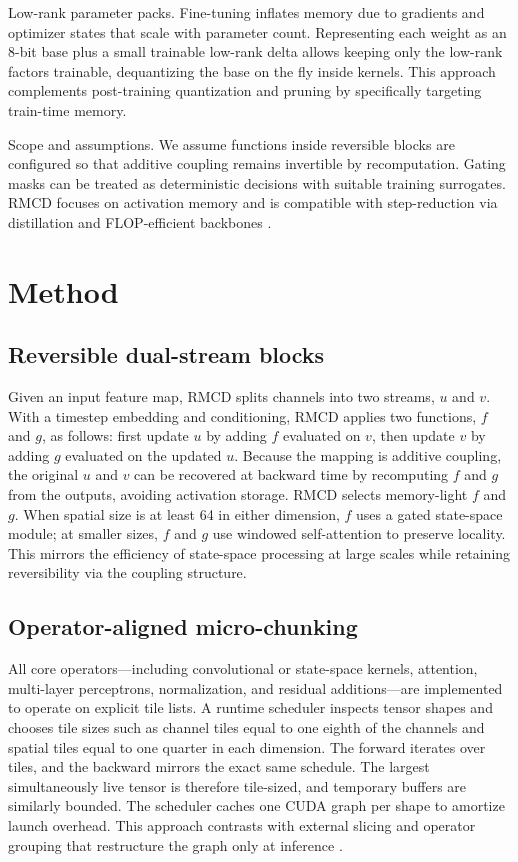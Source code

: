 \documentclass{article}
\begin{document}
Low-rank parameter packs. Fine-tuning inflates memory due to gradients and optimizer states that scale with parameter count. Representing each weight as an 8-bit base plus a small trainable low-rank delta allows keeping only the low-rank factors trainable, dequantizing the base on the fly inside kernels. This approach complements post-training quantization \cite{shang-2022-post} and pruning \cite{fang-2023-structural} by specifically targeting train-time memory.

Scope and assumptions. We assume functions inside reversible blocks are configured so that additive coupling remains invertible by recomputation. Gating masks can be treated as deterministic decisions with suitable training surrogates. RMCD focuses on activation memory and is compatible with step-reduction via distillation \cite{salimans-2024-multistep} and FLOP-efficient backbones \cite{yan-2023-diffusion}.

\section{Method}
\subsection{Reversible dual-stream blocks}
Given an input feature map, RMCD splits channels into two streams, \(u\) and \(v\). With a timestep embedding and conditioning, RMCD applies two functions, \(f\) and \(g\), as follows: first update \(u\) by adding \(f\) evaluated on \(v\), then update \(v\) by adding \(g\) evaluated on the updated \(u\). Because the mapping is additive coupling, the original \(u\) and \(v\) can be recovered at backward time by recomputing \(f\) and \(g\) from the outputs, avoiding activation storage. RMCD selects memory-light \(f\) and \(g\). When spatial size is at least 64 in either dimension, \(f\) uses a gated state-space module; at smaller sizes, \(f\) and \(g\) use windowed self-attention to preserve locality. This mirrors the efficiency of state-space processing at large scales \cite{yan-2023-diffusion} while retaining reversibility via the coupling structure.

\subsection{Operator-aligned micro-chunking}
All core operators—including convolutional or state-space kernels, attention, multi-layer perceptrons, normalization, and residual additions—are implemented to operate on explicit tile lists. A runtime scheduler inspects tensor shapes and chooses tile sizes such as channel tiles equal to one eighth of the channels and spatial tiles equal to one quarter in each dimension. The forward iterates over tiles, and the backward mirrors the exact same schedule. The largest simultaneously live tensor is therefore tile-sized, and temporary buffers are similarly bounded. The scheduler caches one CUDA graph per shape to amortize launch overhead. This approach contrasts with external slicing and operator grouping that restructure the graph only at inference \cite{zhan-2024-fast}.
\end{document}
